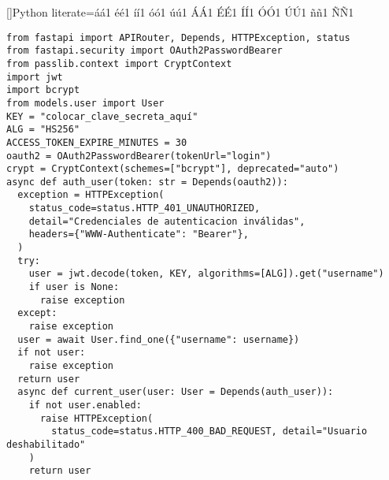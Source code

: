 []{Python}{
literate={á}{{\'a}}1 {é}{{\'e}}1 {í}{{\'i}}1 {ó}{{\'o}}1 {ú}{{\'u}}1
{Á}{{\'A}}1 {É}{{\'E}}1 {Í}{{\'I}}1 {Ó}{{\'O}}1 {Ú}{{\'U}}1
{ñ}{{\~n}}1 {Ñ}{{\~N}}1
}


\begin{lstlisting}[label=cod:vControl,caption=Pseudocódigo del control de acceso, language=PythonUTF8]
from fastapi import APIRouter, Depends, HTTPException, status
from fastapi.security import OAuth2PasswordBearer
from passlib.context import CryptContext
import jwt
import bcrypt
from models.user import User
KEY = "colocar_clave_secreta_aquí"
ALG = "HS256"
ACCESS_TOKEN_EXPIRE_MINUTES = 30
oauth2 = OAuth2PasswordBearer(tokenUrl="login")
crypt = CryptContext(schemes=["bcrypt"], deprecated="auto")
async def auth_user(token: str = Depends(oauth2)):
  exception = HTTPException(
    status_code=status.HTTP_401_UNAUTHORIZED,
    detail="Credenciales de autenticacion inválidas",
    headers={"WWW-Authenticate": "Bearer"},
  )
  try:
    user = jwt.decode(token, KEY, algorithms=[ALG]).get("username") 
    if user is None:
      raise exception   
  except:
    raise exception
  user = await User.find_one({"username": username})
  if not user:
    raise exception
  return user
  async def current_user(user: User = Depends(auth_user)):
    if not user.enabled:
      raise HTTPException(
        status_code=status.HTTP_400_BAD_REQUEST, detail="Usuario deshabilitado"
    )
    return user
\end{lstlisting}